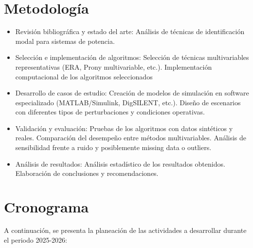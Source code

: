 \section{Metodología}

\begin{itemize}
\item Revisión bibliográfica y estado del arte: Análisis de técnicas de identificación modal para sistemas de potencia.
\item Selección e implementación de algoritmos: Selección de técnicas multivariables representativas (ERA, Prony multivariable, etc.). Implementación computacional de los algoritmos seleccionados
\item Desarrollo de casos de estudio: Creación de modelos de simulación en software especializado (MATLAB/Simulink, DigSILENT, etc.). Diseño de escenarios con diferentes tipos de perturbaciones y condiciones operativas.
\item Validación y evaluación: Pruebas de los algoritmos con datos sintéticos y reales. Comparación del desempeño entre métodos multivariables. Análisis de sensibilidad frente a ruido y posiblemente missing data o outliers.
\item Análisis de resultados: Análisis estadístico de los resultados obtenidos. Elaboración de conclusiones y recomendaciones.
\end{itemize}

\section{Cronograma}


A continuación, se presenta la planeación de las actividades a desarrollar durante el periodo 2025-2026:



\chapterbibliography 








